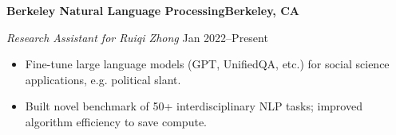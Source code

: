 \textbf{Berkeley Natural Language Processing\hfill Berkeley, CA}\par
\textit{Research Assistant for Ruiqi Zhong} \hfill Jan 2022--Present\par
\begin{itemize}
	\item Fine-tune large language models (GPT, UnifiedQA, etc.) for social science applications, e.g. political slant.
	\item Built novel benchmark of 50+ interdisciplinary NLP tasks; improved algorithm efficiency to save compute.
\end{itemize} \par